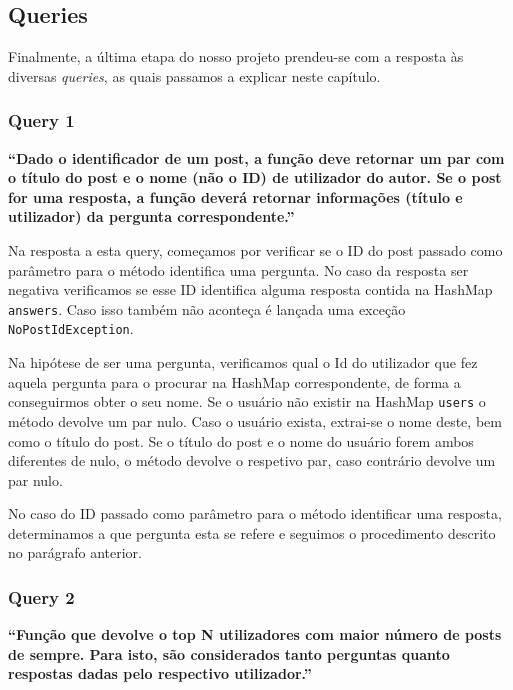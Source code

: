 \documentclass[a4paper]{article}
\begin{document}
\subsection{Queries}
\label{sec:queries}

Finalmente, a última etapa do nosso projeto prendeu-se com a resposta às diversas
\textit{queries}, as quais passamos a explicar neste capítulo.


\subsubsection*{Query 1}
\label{sec:query1}

\textbf{“Dado o identificador de um post, a função deve retornar
um par com o título do post e o nome (não o ID) de utilizador do autor. Se o post
for uma resposta, a função deverá retornar informações (título e utilizador)
da pergunta correspondente.”} \par

\vspace{0.1cm}

Na resposta a esta query, começamos por verificar se o ID do post passado como
parâmetro  para o método identifica uma pergunta. No caso da resposta ser negativa
verificamos se esse ID identifica alguma resposta contida
na HashMap \texttt{answers}. Caso isso também não aconteça é lançada uma exceção
\texttt{NoPostIdException}. \par
Na hipótese de ser uma pergunta, verificamos qual o Id do utilizador que fez aquela
pergunta para o procurar na HashMap correspondente, de forma a conseguirmos obter
o seu nome. Se o usuário não existir na HashMap \texttt{users} o método devolve um
par nulo. Caso o usuário exista, extrai-se o nome deste, bem como o título do
post. Se o título do post e o nome do usuário forem ambos diferentes de nulo, o
método devolve o respetivo par, caso contrário devolve um par nulo. \par
No caso do ID passado como parâmetro para o método identificar uma resposta, determinamos
a que pergunta esta se refere e seguimos o procedimento descrito no parágrafo anterior.


\subsubsection*{Query 2}
\label{sec:query2}

\textbf{“Função que devolve o top N utilizadores com maior número
de posts de sempre. Para isto, são considerados tanto perguntas
quanto respostas dadas pelo respectivo utilizador.”}
\end{document}
